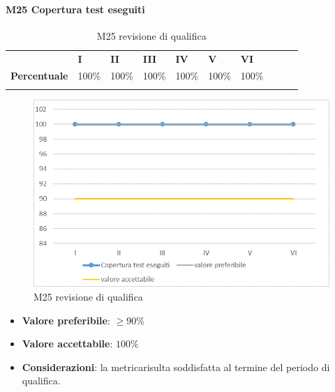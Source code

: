\paragraph{M25 Copertura test eseguiti} \mbox{}
\begin{longtable}[H!] {						
		>{}p{50mm}  		
		>{}p{8mm}
		>{}p{8mm}		
		>{}p{8mm}		
		>{}p{8mm}		
		>{}p{8mm}		
		>{}p{8mm}
		>{}p{8mm}
		>{}p{8mm}
		>{}p{8mm}
	}
	\rowcolor{gray!50}
	\textbf{} & \textbf{I} & \textbf{II} & \textbf{III} & \textbf{IV} & \textbf{V} & \textbf{VI} \TBstrut \\ [2mm]
	\textbf{Percentuale} & 100\% & 100\% & 100\% & 100\% & 100\% & 100\% \TBstrut \\ [2mm]
	\rowcolor{white}
	\caption{M25 revisione di qualifica}
\end{longtable}
\begin{figure}[H] 	
	\includegraphics[width=\linewidth]{./img/grafici/RQ25.png}	
	\caption{M25 revisione di qualifica}	
\end{figure}
\begin{itemize}
		\item \textbf{Valore preferibile}: $\ge 90\%$
		\item \textbf{Valore accettabile}: $100\%$
		\item \textbf{Considerazioni}: la metrica\glosp risulta soddisfatta al termine del periodo di qualifica.
	\end{itemize}

